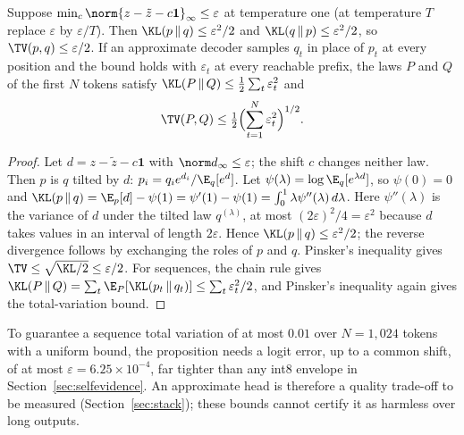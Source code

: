 \begin{proposition}\label{prop:kl}
Suppose $\min_c\norm{z-\tilde z-c\mathbf 1}_\infty\le\varepsilon$ at temperature one (at temperature $T$ replace $\varepsilon$ by $\varepsilon/T$). Then $\KL(p\,\|\,q)\le\varepsilon^2/2$ and $\KL(q\,\|\,p)\le\varepsilon^2/2$, so $\TV(p,q)\le\varepsilon/2$. If an approximate decoder samples $q_t$ in place of $p_t$ at every position and the bound holds with $\varepsilon_t$ at every reachable prefix, the laws $P$ and $Q$ of the first $N$ tokens satisfy $\KL(P\,\|\,Q)\le\tfrac12\sum_t\varepsilon_t^2$ and
\[\TV(P,Q)\le\tfrac12\Bigl(\sum_{t=1}^N\varepsilon_t^2\Bigr)^{1/2}.\]
\end{proposition}
\begin{proof}
Let $d=z-\tilde z-c\mathbf 1$ with $\norm d_\infty\le\varepsilon$; the shift $c$ changes neither law. Then $p$ is $q$ tilted by $d$: $p_i=q_ie^{d_i}/\E_q[e^d]$. Let $\psi(\lambda)=\log\E_q[e^{\lambda d}]$, so $\psi(0)=0$ and $\KL(p\,\|\,q)=\E_p[d]-\psi(1)=\psi'(1)-\psi(1)=\int_0^1\lambda\psi''(\lambda)\,d\lambda$. Here $\psi''(\lambda)$ is the variance of $d$ under the tilted law $q^{(\lambda)}$, at most $(2\varepsilon)^2/4=\varepsilon^2$ because $d$ takes values in an interval of length $2\varepsilon$. Hence $\KL(p\,\|\,q)\le\varepsilon^2/2$; the reverse divergence follows by exchanging the roles of $p$ and $q$. Pinsker's inequality gives $\TV\le\sqrt{\KL/2}\le\varepsilon/2$. For sequences, the chain rule gives $\KL(P\,\|\,Q)=\sum_t\E_P[\KL(p_t\,\|\,q_t)]\le\sum_t\varepsilon_t^2/2$, and Pinsker's inequality again gives the total-variation bound.
\end{proof}
To guarantee a sequence total variation of at most $0.01$ over $N=1{,}024$ tokens with a uniform bound, the proposition needs a logit error, up to a common shift, of at most $\varepsilon=6.25\times10^{-4}$, far tighter than any int8 envelope in Section~\ref{sec:selfevidence}. An approximate head is therefore a quality trade-off to be measured (Section~\ref{sec:stack}); these bounds cannot certify it as harmless over long outputs.


